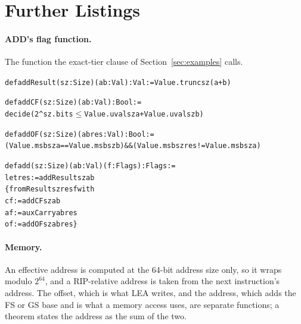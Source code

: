 \documentclass[runningheads]{llncs}
\newcommand{\src}[1]{}  %
\begin{document}
\appendix
\section{Further Listings}
\label{app:listings}

\paragraph{ADD's flag function.} The function the exact-tier clause of Section~\ref{sec:examples} calls.

{\scriptsize
\begin{alltt}
def addResult (sz : Size) (a b : Val) : Val := Value.trunc sz (a + b)

def addCF (sz : Size) (a b : Val) : Bool :=
  decide (2 ^ sz.bits \(\le\) Value.uval sz a + Value.uval sz b)

def addOF (sz : Size) (a b res : Val) : Bool :=
  (Value.msb sz a == Value.msb sz b) && (Value.msb sz res != Value.msb sz a)

def add (sz : Size) (a b : Val) (f : Flags) : Flags :=
  let res := addResult sz a b
  \{ fromResult sz res f with
    cf := addCF sz a b
    af := auxCarry a b res
    of := addOF sz a b res \}
\end{alltt}
}

\paragraph{Memory.}
An effective address is computed at the 64-bit address size only, so it wraps modulo $2^{64}$, and a
RIP-relative address is taken from the next instruction's address. The offset, which is what LEA
writes, and the address, which adds the FS or GS base and is what a memory access uses, are separate
functions; a theorem states the address as the sum of the two.
\src{X86/Syntax.lean structure Ea has no address-size field (addr32 is only JRCXZ's and LOOP's counter); X86/Semantics.lean Ea.offset, Ea.addr, Ea.addr\_eq\_segBase\_add; the .lea arm writes ea.offset}
\end{document}

